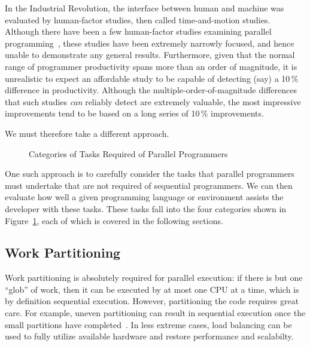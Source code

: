 In the Industrial Revolution, the interface between human and machine
was evaluated by human-factor studies, then called time-and-motion
studies.
Although there have been a few human-factor studies examining parallel
programming~\cite{RyanEccles2005HPCSNovice,RyanEccles2006HPCSNoviceNeeds,
LorinHochstein2005SC,DuaneSzafron1994PEMPDS}, these studies have
been extremely narrowly focused, and hence unable to demonstrate any
general results.
Furthermore, given that the normal range of programmer productivity
spans more than an order of magnitude, it is unrealistic to expect
an affordable study to be capable of detecting (say) a 10\,\% difference
in productivity.
Although the multiple-order-of-magnitude differences that such studies
\emph{can} reliably detect are extremely valuable, the most impressive
improvements tend to be based on a long series of 10\,\% improvements.

We must therefore take a different approach.

\begin{figure}[tb]
\centering
{}
\caption{Categories of Tasks Required of Parallel Programmers}
\label{fig:intro:Categories of Tasks Required of Parallel Programmers}
\end{figure}

One such approach is to carefully consider the tasks that parallel
programmers must undertake that are not required of sequential programmers.
We can then evaluate how well a given programming language or environment
assists the developer with these tasks.
These tasks fall into the four categories shown in
Figure~\ref{fig:intro:Categories of Tasks Required of Parallel Programmers},
each of which is covered in the following sections.

\subsection{Work Partitioning}
\label{sec:intro:Work Partitioning}

Work partitioning is absolutely required for parallel execution:
if there is but one ``glob'' of work, then it can be executed by at
most one CPU at a time, which is by definition sequential execution.
However, partitioning the code requires great care.
For example, uneven partitioning can result in sequential execution
once the small partitions have completed~\cite{GeneAmdahl1967AmdahlsLaw}.
In less extreme cases, load balancing can be used to fully utilize
available hardware and restore performance and scalabilty.

